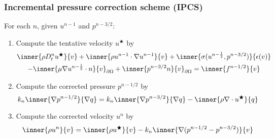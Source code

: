 \begin{frame}
  \frametitle{Incremental pressure correction scheme (IPCS)}

  For each $n$, given $u^{n-1}$ and \alert{$p^{n-3/2}$}:
  \begin{enumerate}
  \item
    Compute the tentative velocity $u^\bigstar$ by
    \begin{multline*}
      \inner{\rho D_t^n u^{\bigstar}}{v}
      + \inner{\rho u^{n-1} \cdot \nabla u^{n-1}}{v}
      + \inner{\sigma(u^{n-\frac{1}{2}}, p^{n-3/2})}{\epsilon(v)} \\
      - \inner{\mu \nabla u^{n-\frac{1}{2}} \cdot n}{v}_{\partial\Omega}
      + \inner{p^{n-3/2} n}{v}_{\partial\Omega}
      = \inner{f^{n-1/2}}{v}
    \end{multline*}
  \item
    Compute the corrected pressure $p^{n-1/2}$ by
    \begin{equation*}
      k_n \inner{\nabla p^{n-1/2}}{\nabla q}
      = k_n \inner{\nabla p^{n-3/2}}{\nabla q}
      - \inner{\rho \nabla \cdot u^{\bigstar}}{q}
    \end{equation*}
  \item
    Compute the corrected velocity $u^n$ by
    \begin{equation*}
      \inner{\rho u^n}{v} = \inner{\rho u^{\bigstar}}{v}
      - k_n\inner{\nabla(p^{n-1/2} - p^{n-3/2})}{v}
    \end{equation*}
  \end{enumerate}

\end{frame}

